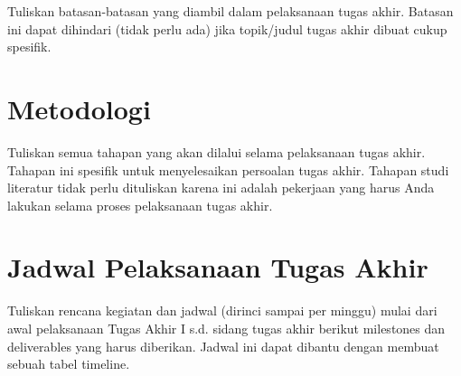 Tuliskan batasan-batasan yang diambil dalam pelaksanaan tugas akhir. Batasan ini dapat dihindari (tidak perlu ada) jika topik/judul tugas akhir dibuat cukup spesifik.

\section{Metodologi}

Tuliskan semua tahapan yang akan dilalui selama pelaksanaan tugas akhir. Tahapan ini spesifik untuk menyelesaikan persoalan tugas akhir. Tahapan studi literatur tidak perlu dituliskan karena ini adalah pekerjaan yang harus Anda lakukan selama proses pelaksanaan tugas akhir.

\section{Jadwal Pelaksanaan Tugas Akhir}

Tuliskan rencana kegiatan dan jadwal (dirinci sampai per minggu) mulai dari awal pelaksanaan Tugas Akhir I s.d. sidang tugas akhir berikut milestones dan deliverables yang harus diberikan. Jadwal ini dapat dibantu dengan membuat sebuah tabel timeline.